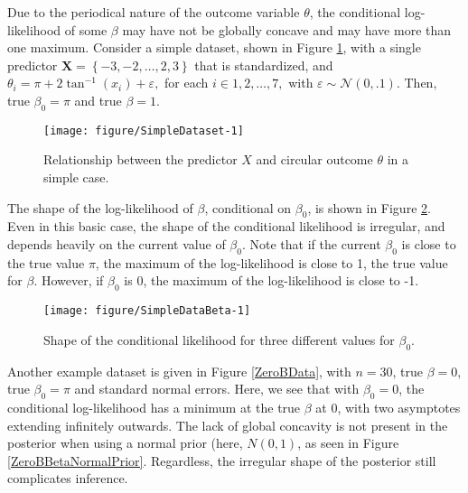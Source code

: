 \documentclass[12pt,a4paper]{article}\usepackage[]{graphicx}\usepackage[]{color}
\makeatletter
\def\maxwidth{ %
  \ifdim\Gin@nat@width>\linewidth
    \linewidth
  \else
    \Gin@nat@width
  \fi
}
\newenvironment{knitrout}{}{} %
\makeatother
\begin{document}
Due to the periodical nature of the outcome variable $\theta$, the conditional log-likelihood of some $\beta$ may have not be globally concave and may have more than one maximum. Consider a simple dataset, shown in Figure \ref{SimpleDataset}, with a single predictor $\boldsymbol{X} = \left\lbrace -3, -2, \dots, 2, 3 \right\rbrace $ that is standardized, and $\theta_i = \pi + 2 \tan^{-1} (x_i) + \varepsilon,$ for each $ i \in 1, 2, \dots, 7,$ with $\varepsilon \sim \mathcal{N}(0, .1)$. Then, true $\beta_0 = \pi$ and true $\beta = 1$.

\begin{figure}
\label{SimpleDataset}
\begin{knitrout}
\color{fgcolor}

{\centering \texttt{[image: figure/SimpleDataset-1]} 

}



\end{knitrout}
\caption{Relationship between the predictor $X$ and circular outcome $\theta$ in a simple case.}
\label{SimpleDataset}
\end{figure}

The shape of the log-likelihood of $\beta$, conditional on $\beta_0$, is shown in Figure \ref{SimpleDataBeta}. Even in this basic case, the shape of the conditional likelihood is irregular, and depends heavily on the current value of $\beta_0$. Note that if the current $\beta_0$ is close to the true value $\pi$, the maximum of the log-likelihood is close to 1, the true value for $\beta$. However, if $\beta_0$ is 0, the maximum of the log-likelihood is close to -1.

\begin{figure}
\label{SimpleDataBeta}
\begin{knitrout}
\color{fgcolor}

{\centering \texttt{[image: figure/SimpleDataBeta-1]} 

}



\end{knitrout}
\caption{Shape of the conditional likelihood for three different values for $\beta_0$.}
\label{SimpleDataBeta}
\end{figure}

Another example dataset is given in Figure \ref{ZeroBData}, with $n = 30$, true $\beta = 0$, true $\beta_0 = \pi$ and standard normal errors. Here, we see that with $\beta_0 = 0$, the conditional log-likelihood has a minimum at the true $\beta$ at 0, with two asymptotes extending infinitely outwards. The lack of global concavity is not present in the posterior when using a normal prior (here, $N(0, 1)$, as seen in Figure \ref{ZeroBBetaNormalPrior}. Regardless, the irregular shape of the posterior still complicates inference.
\end{document}
